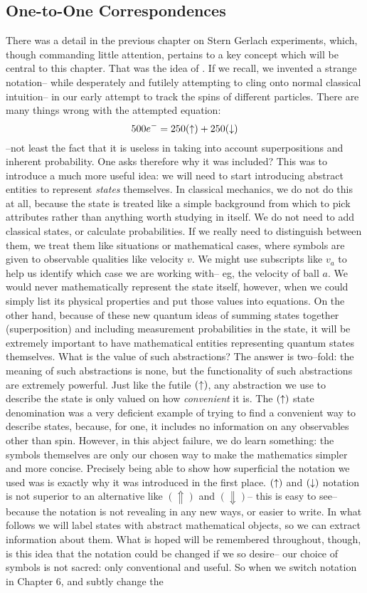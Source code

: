 \subsection{One-to-One Correspondences}
There was a detail in the previous chapter on Stern Gerlach experiments, which, though commanding little attention, pertains to a key concept which will be central to this chapter. That was the idea of . If we recall, we invented a strange notation-- while desperately and futilely attempting to cling onto normal classical intuition--  in our early attempt to track the spins of different particles. There are many things wrong with the attempted equation:
$$
500e^{-}=250(\uparrow) + 250(\downarrow)
$$
--not least the fact that it is useless in taking into account superpositions and inherent probability. One asks therefore why it was included? This was to introduce a much more useful idea: we will need to start introducing abstract entities to represent \textit{states} themselves. In classical mechanics, we do not do this at all, because the state is treated like a simple background from which to pick attributes rather than anything worth studying in itself. We do not need to add classical states, or calculate probabilities. If we really need to distinguish between them, we treat them like situations or mathematical cases, where symbols are given to observable qualities like velocity $v$. We might use subscripts like $v_{a}$ to help us identify which case we are working with-- eg, the velocity of ball $a$. We would never mathematically represent the state itself, however, when we could simply list its physical properties and put those values into equations. On the other hand, because of these new quantum ideas of summing states together (superposition) and including measurement probabilities in the state, it will be extremely important to have mathematical entities representing quantum states themselves. What is the value of such abstractions? The answer is two--fold: the meaning of such abstractions is none, but the functionality of such abstractions are extremely powerful. Just like the futile $(\uparrow)$, any abstraction we use to describe the state is only valued on how \textit{convenient} it is. The $(\uparrow)$ state denomination was a very deficient example of trying to find a convenient way to describe states, because, for one, it includes no information on any observables other than spin. However, in this abject failure, we do learn something: the symbols themselves are only our chosen way to make the mathematics simpler and more concise. Precisely being able to show how superficial the notation we used was is exactly why it was introduced in the first place. $(\uparrow)$ and $(\downarrow)$ notation is not superior to an alternative like $(\Uparrow)$ and $(\Downarrow)$-- this is easy to see-- because the notation is not revealing in any new ways, or easier to write. In what follows we will label states with abstract mathematical objects, so we can extract information about them. What is hoped will be remembered throughout, though, is this idea that the notation could be changed if we so desire-- our choice of symbols is not sacred: only conventional and useful. So when we switch notation in Chapter 6, and subtly change the 